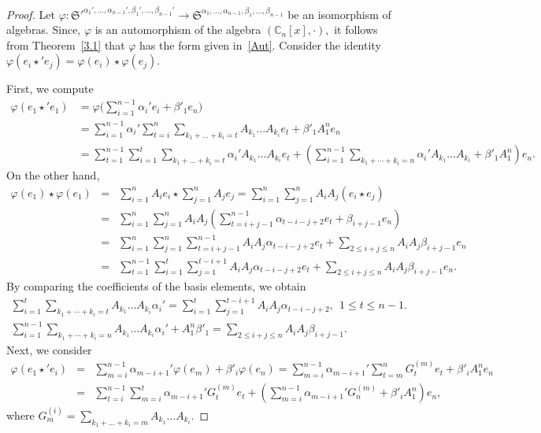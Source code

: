 \documentclass{jonasart}
\begin{document}
	\begin{proof}
		Let $\varphi: \mathfrak{S}'^{\alpha_1 ',\dots,\alpha_{n-1}', \beta_{1}',\dots, \beta_{n-1}'} \rightarrow \mathfrak{S}^{\alpha_1,\dots,\alpha_{n-1}, \beta_{1},\dots, \beta_{n-1}}$ be an isomorphism of algebras. Since, $\varphi$ is an automorphism of the algebra $(\mathbb{C}_n [x],\cdot),$ it follows from Theorem~\ref{3.1} that $\varphi$ has the form given in~\eqref{Aut}. Consider the identity $\varphi(e_i \star' e_j ) = \varphi(e_i )\star \varphi(e_j ).$

		First, we compute
        \begin{align*}
            \varphi(e_1 \star' e_1 ) 
            &= \varphi\Big(\sum_{i=1}^{n-1}\alpha_{i}'e_i + \beta'_{1}e_n\Big) \\
            &=\sum_{i=1}^{n-1} \alpha_i '\sum_{t=i}^{n}\sum_{k_1 +\dots +k_i =t} A_{k_1}\dots A_{k_i}e_t + \beta'_{1} A_1^n e_n \\
            &= \sum_{t=1}^{n-1} \sum_{i=1}^{t} \sum_{k_1 +\dots +k_i =t}\alpha_i ' A_{k_1} \dots A_{k_i}e_t + \left( \sum_{i=1}^{n-1} \sum_{k_1 +\cdots+k_i =n} \alpha_i ' A_{k_1} \dots A_{k_i} +\beta'_{1} A_1^n\right) e_n.
        \end{align*}
		On the other hand,
		\[
			\begin{array}{lcl}
				\varphi(e_1 ) \star \varphi(e_1 ) &=& \sum_{i=1}^n A_i e_i \star \sum_{j=1}^n A_j e_j =
				\sum_{i=1}^n \sum_{j=1}^n A_i A_j (e_i \star e_j )\\[1mm]
				&=&
				\sum_{i=1}^n \sum_{j=1}^n A_i A_j \left( \sum_{t=i+j-1}^{n-1} \alpha_{t-i-j+2} e_t + \beta_{i+j-1}e_n \right) \\[1mm]
				&=&
				\sum_{i=1}^n \sum_{j=1}^n \sum_{t=i+j-1}^{n-1} A_i A_j \alpha_{t-i-j+2} e_t + \sum_{2\leq i+j\leq n} A_i A_j \beta_{i+j-1}e_n \\[1mm]
				&=&
				\sum_{t=1}^{n-1}\sum_{i=1}^{t} \sum_{j=1}^{t-i+1} A_i A_j \alpha_{t-i-j+2} e_t + \sum_{2\leq i+j\leq n} A_i A_j \beta_{i+j-1}e_n.
			\end{array}
		\]
		By comparing the coefficients of the basis elements, we obtain
		\begin{gather*}
			\sum_{i=1}^t\sum_{k_1 +\cdots+k_i =t} A_{k_1} \dots A_{k_i}\alpha_i ' = \sum_{i=1}^{t} \sum_{j=1}^{t-i+1} A_i A_j \alpha_{t-i-j+2}, \ \ 1\leq t\leq n-1. \\
			\sum_{i=1}^{n-1} \sum_{k_1 +\cdots+k_i =n} A_{k_1} \dots A_{k_i} \alpha_i ' + A_1^n \beta'_{1} = \sum_{2\leq i+j\leq n} A_i A_j \beta_{i+j-1}.
		\end{gather*}
		Next, we consider
		\[
			\begin{array}{lcl}
				\varphi(e_1 \star' e_i ) &= & \sum_{m=i}^{n-1}\alpha_{m-i+1}'\varphi(e_m )+ \beta'_{i}\varphi(e_n ) =\sum_{m=i}^{n-1} \alpha_{m-i+1}'\sum_{t=m}^{n}G_t^{(m)} e_t + \beta'_{i} A_1^n e_n \\[1mm]
				&=& \sum_{t=i}^{n-1} \sum_{m=i}^{t} \alpha_{m-i+1}' G_t^{(m)}e_t + \left( \sum_{m=i}^{n-1} \alpha_{m-i+1}' G_n^{(m)} +\beta'_{i} A_1^n\right) e_n,
			\end{array}
		\]
		where $G_m^{(i)}= \sum_{k_1 + \dots +k_i =m} A_{k_1} \dots A_{k_i}$.


\end{proof}
\end{document}

